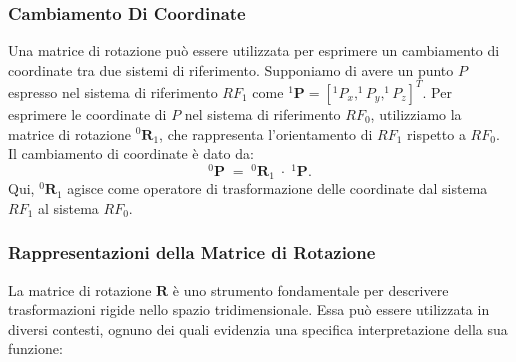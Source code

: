 \documentclass[11pt, a4paper]{report}
\begin{document}
\subsubsection{Cambiamento Di Coordinate}
Una matrice di rotazione può essere utilizzata per esprimere un cambiamento di coordinate tra due sistemi di riferimento. Supponiamo di avere un punto $ P $ espresso nel sistema di riferimento $ RF_{1} $ come $ ^1\mathbf{P} = [^1P_x, ^1P_y, ^1P_z]^T $. Per esprimere le coordinate di $ P $ nel sistema di riferimento $ RF_{0} $, utilizziamo la matrice di rotazione $ ^{0}\mathbf{R}_{1} $, che rappresenta l'orientamento di $ RF_{1} $ rispetto a $ RF_{0} $. Il cambiamento di coordinate è dato da:
\[
    ^0\mathbf{P} \; = \; ^{0}\mathbf{R}_{1} \; \cdot \;^{1}\mathbf{P}.
\]
Qui, $ ^{0}\mathbf{R}_{1} $ agisce come operatore di trasformazione delle coordinate dal sistema $ RF_{1} $ al sistema $ RF_{0} $.

\subsubsection{Rappresentazioni della Matrice di Rotazione}

La matrice di rotazione $\mathbf{R}$ è uno strumento fondamentale per descrivere trasformazioni rigide nello spazio tridimensionale. Essa può essere utilizzata in diversi contesti, ognuno dei quali evidenzia una specifica interpretazione della sua funzione:
\end{document}
